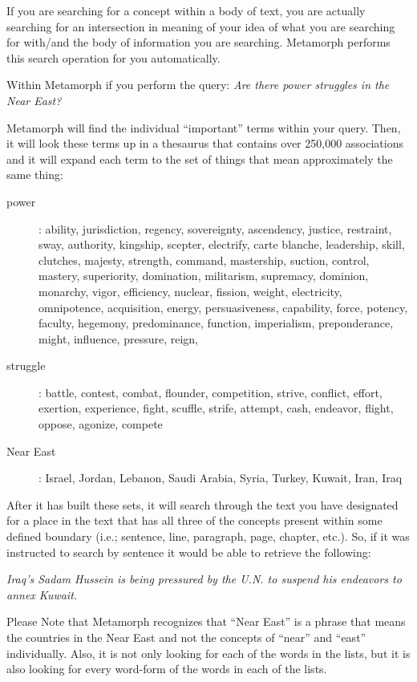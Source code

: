 If you are searching for a concept within a body of text, you are
actually searching for an intersection in meaning of your idea of
what you are searching for with/and the body of information you
are searching.  Metamorph performs this search operation for you
automatically.

Within Metamorph if you perform the query:
{\em Are there power struggles in the Near East?}

Metamorph will find the individual ``important'' terms within your
query.  Then, it will look these terms up in a thesaurus that
contains over 250,000 associations and it will expand each term to
the set of things that mean approximately the same thing:
\begin{description}
\item[power]:  ability, jurisdiction, regency,
sovereignty, ascendency, justice, restraint, sway,
authority, kingship, scepter, electrify, carte
blanche, leadership, skill, clutches, majesty,
strength, command, mastership, suction, control,
mastery, superiority, domination, militarism,
supremacy, dominion, monarchy, vigor, efficiency,
nuclear, fission, weight, electricity, omnipotence,
acquisition, energy, persuasiveness, capability,
force, potency, faculty, hegemony, predominance,
function, imperialism, preponderance, might,
influence, pressure, reign,

\item[struggle]:  battle, contest, combat, flounder,
competition, strive, conflict, effort, exertion,
experience, fight, scuffle, strife, attempt, cash,
endeavor, flight, oppose, agonize, compete

\item[Near East]:  Israel, Jordan, Lebanon, Saudi Arabia,
Syria, Turkey, Kuwait, Iran, Iraq
\end{description}
After it has built these sets, it will search through the text you
have designated for a place in the text that has all three of the
concepts present within some defined boundary (i.e.; sentence,
line, paragraph, page, chapter, etc.).  So, if it was instructed
to search by sentence it would be able to retrieve the following:

{\em Iraq's Sadam Hussein is being pressured by the U.N. to suspend his
endeavors to annex Kuwait.}

Please Note that Metamorph recognizes that ``Near East'' is a phrase
that means the countries in the Near East and not the concepts of
``near'' and ``east'' individually.  Also, it is not only looking for
each of the words in the lists, but it is also looking for every
word-form of the words in each of the lists.

